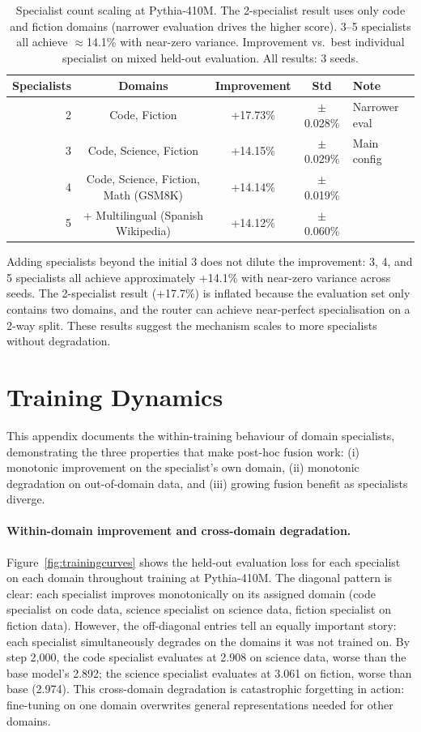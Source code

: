 \documentclass{article}
\begin{document}
\begin{table}[h]
\centering
\caption{Specialist count scaling at Pythia-410M. The 2-specialist result uses only code and fiction domains (narrower evaluation drives the higher score). 3--5 specialists all achieve $\approx$14.1\% with near-zero variance. Improvement vs.\ best individual specialist on mixed held-out evaluation. All results: 3 seeds.}
\label{tab:scaling}
\begin{tabular}{rcccl}
\toprule
\textbf{Specialists} & \textbf{Domains} & \textbf{Improvement} & \textbf{Std} & \textbf{Note} \\
\midrule
2 & Code, Fiction & +17.73\% & $\pm$0.028\% & Narrower eval \\
3 & Code, Science, Fiction & +14.15\% & $\pm$0.029\% & Main config \\
4 & Code, Science, Fiction, Math (GSM8K) & +14.14\% & $\pm$0.019\% & \\
5 & + Multilingual (Spanish Wikipedia) & +14.12\% & $\pm$0.060\% & \\
\bottomrule
\end{tabular}
\end{table}

Adding specialists beyond the initial 3 does not dilute the improvement: 3, 4, and 5 specialists all achieve approximately +14.1\% with near-zero variance across seeds. The 2-specialist result (+17.7\%) is inflated because the evaluation set only contains two domains, and the router can achieve near-perfect specialisation on a 2-way split. These results suggest the mechanism scales to more specialists without degradation.

\section{Training Dynamics}
\label{app:dynamics}

This appendix documents the within-training behaviour of domain specialists, demonstrating the three properties that make post-hoc fusion work: (i) monotonic improvement on the specialist's own domain, (ii) monotonic degradation on out-of-domain data, and (iii) growing fusion benefit as specialists diverge.

\paragraph{Within-domain improvement and cross-domain degradation.}
Figure~\ref{fig:trainingcurves} shows the held-out evaluation loss for each specialist on each domain throughout training at Pythia-410M. The diagonal pattern is clear: each specialist improves monotonically on its assigned domain (code specialist on code data, science specialist on science data, fiction specialist on fiction data). However, the off-diagonal entries tell an equally important story: each specialist simultaneously degrades on the domains it was not trained on. By step 2,000, the code specialist evaluates at 2.908 on science data, worse than the base model's 2.892; the science specialist evaluates at 3.061 on fiction, worse than base (2.974). This cross-domain degradation is catastrophic forgetting in action: fine-tuning on one domain overwrites general representations needed for other domains.
\end{document}
